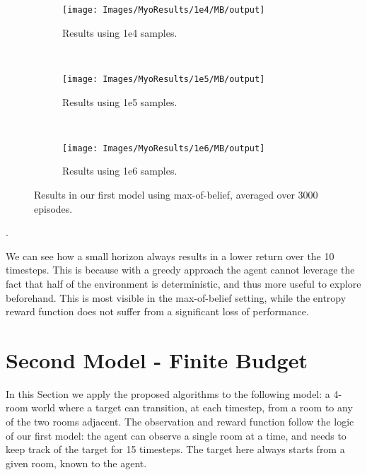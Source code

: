 \begin{figure}[ht!]
        \centering
        \begin{subfigure}[t]{0.3\textwidth}
                \texttt{[image: Images/MyoResults/1e4/MB/output]}
                \caption{Results using 1e4 samples.}
                \label{fig:m4m}
        \end{subfigure}%
        ~ %
        \begin{subfigure}[t]{0.3\textwidth}
                \texttt{[image: Images/MyoResults/1e5/MB/output]}
                \caption{Results using 1e5 samples.}
                \label{fig:m5m}
        \end{subfigure}
        ~ %
        \begin{subfigure}[t]{0.3\textwidth}
                \texttt{[image: Images/MyoResults/1e6/MB/output]}
                \caption{Results using 1e6 samples.}
                \label{fig:m6m}
        \end{subfigure}
        \caption{Results in our first model using max-of-belief, averaged over 3000 episodes.}
        \label{ref:myombfig}
\end{figure}

.

We can see how a small horizon always results in a lower return over the 10 timesteps. This is
because with a greedy approach the agent cannot leverage the fact that half of the environment is
deterministic, and thus more useful to explore beforehand. This is most visible in the max-of-belief
setting, while the entropy reward function does not suffer from a significant loss of performance.

\clearpage
\section{Second Model - Finite Budget}

In this Section we apply the proposed algorithms to the following model: a 4-room world where a
target can transition, at each timestep, from a room to any of the two rooms adjacent. The
observation and reward function follow the logic of our first model: the agent can observe a single
room at a time, and needs to keep track of the target for 15 timesteps. The target here always
starts from a given room, known to the agent.

